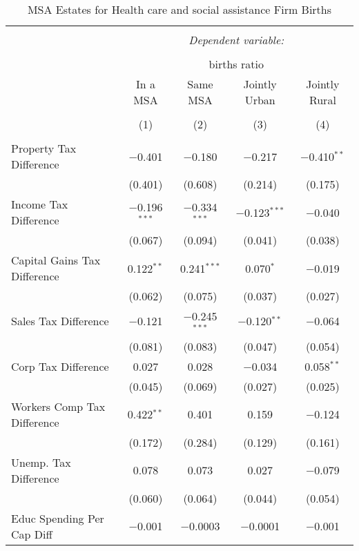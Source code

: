 
\begin{table}[!htbp] \centering 
  \caption{MSA Estates for  Health care and social assistance Firm Births} 
  \label{62metro} 
\begin{tabular}{@{\extracolsep{5pt}}lcccc} 
\\[-1.8ex]\hline 
\hline \\[-1.8ex] 
 & \multicolumn{4}{c}{\textit{Dependent variable:}} \\ 
\cline{2-5} 
\\[-1.8ex] & \multicolumn{4}{c}{births ratio} \\ 
 & In a MSA & Same MSA & Jointly Urban & Jointly Rural \\ 
\\[-1.8ex] & (1) & (2) & (3) & (4)\\ 
\hline \\[-1.8ex] 
 Property Tax Difference & $-$0.401 & $-$0.180 & $-$0.217 & $-$0.410$^{**}$ \\ 
  & (0.401) & (0.608) & (0.214) & (0.175) \\ 
  Income Tax Difference & $-$0.196$^{***}$ & $-$0.334$^{***}$ & $-$0.123$^{***}$ & $-$0.040 \\ 
  & (0.067) & (0.094) & (0.041) & (0.038) \\ 
  Capital Gains Tax Difference & 0.122$^{**}$ & 0.241$^{***}$ & 0.070$^{*}$ & $-$0.019 \\ 
  & (0.062) & (0.075) & (0.037) & (0.027) \\ 
  Sales Tax Difference & $-$0.121 & $-$0.245$^{***}$ & $-$0.120$^{**}$ & $-$0.064 \\ 
  & (0.081) & (0.083) & (0.047) & (0.054) \\ 
  Corp Tax Difference & 0.027 & 0.028 & $-$0.034 & 0.058$^{**}$ \\ 
  & (0.045) & (0.069) & (0.027) & (0.025) \\ 
  Workers Comp Tax Difference & 0.422$^{**}$ & 0.401 & 0.159 & $-$0.124 \\ 
  & (0.172) & (0.284) & (0.129) & (0.161) \\ 
  Unemp. Tax Difference & 0.078 & 0.073 & 0.027 & $-$0.079 \\ 
  & (0.060) & (0.064) & (0.044) & (0.054) \\ 
  Educ Spending Per Cap Diff & $-$0.001 & $-$0.0003 & $-$0.0001 & $-$0.001 \\ 

\end{tabular}
\end{table}
